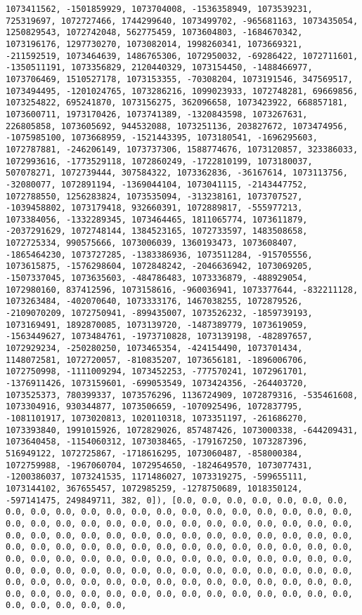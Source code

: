 \documentclass[11pt]{article}
\begin{document}
\begin{verbatim}
1073411562, -1501859929, 1073704008, -1536358949, 1073539231, 725319697, 1072727466, 1744299640, 1073499702, -965681163, 1073435054, 1250829543, 1072742048, 562775459, 1073604803, -1684670342, 1073196176, 1297730270, 1073082014, 1998260341, 1073669321, -211592519, 1073464639, 1486765306, 1072950032, -69286422, 1072711601, -1350511191, 1073356829, 2120440329, 1073154450, -1488466977, 1073706469, 1510527178, 1073153355, -70308204, 1073191546, 347569517, 1073494495, -1201024765, 1073286216, 1099023933, 1072748281, 69669856, 1073254822, 695241870, 1073156275, 362096658, 1073423922, 668857181, 1073600711, 1973170426, 1073741389, -1320843598, 1073267631, 226805858, 1073605692, 944532088, 1073251136, 203827672, 1073474956, -1075985100, 1073668959, -1521443395, 1073180541, -1696295603, 1072787881, -246206149, 1073737306, 1588774676, 1073120857, 323386033, 1072993616, -1773529118, 1072860249, -1722810199, 1073180037, 507078271, 1072739444, 307584322, 1073362836, -36167614, 1073113756, -32080077, 1072891194, -1369044104, 1073041115, -2143447752, 1072788550, 1256283824, 1073535094, -313238161, 1073707527, -1039458802, 1073179418, 932660391, 1072889817, -555977213, 1073384056, -1332289345, 1073464465, 1811065774, 1073611879, -2037291629, 1072748144, 1384523165, 1072733597, 1483508658, 1072725334, 990575666, 1073006039, 1360193473, 1073608407, -1865464230, 1073727285, -1383386936, 1073511284, -915705556, 1073615875, -1576298604, 1072848242, -2046636942, 1073069205, -1507337045, 1073635603, -484786483, 1073336879, -488929054, 1072980160, 837412596, 1073158616, -960036941, 1073377644, -832211128, 1073263484, -402070640, 1073333176, 1467038255, 1072879526, -2109070209, 1072750941, -899435007, 1073526232, -1859739193, 1073169491, 1892870085, 1073139720, -1487389779, 1073619059, -1563449627, 1073484761, -1973710828, 1073139198, -482897657, 1072929234, -250280250, 1073465354, -424154490, 1073701434, 1148072581, 1072720057, -810835207, 1073656181, -1896006706, 1072750998, -1111009294, 1073452253, -777570241, 1072961701, -1376911426, 1073159601, -699053549, 1073424356, -264403720, 1073525373, 780399337, 1073576296, 1136724909, 1072879316, -535461608, 1073304916, 930344877, 1073506659, -1070925496, 1072837795, -1081101917, 1073020813, 1020110318, 1073351197, -261686270, 1073393840, 1991015926, 1072829026, 857487426, 1073000338, -644209431, 1073640458, -1154060312, 1073038465, -179167250, 1073287396, 516949122, 1072725867, -1718616295, 1073060487, -858000384, 1072759988, -1967060704, 1072954650, -1824649570, 1073077431, -1200386037, 1073241535, 1171486027, 1073319275, -599655111, 1073144102, 367655457, 1072985259, -1278750689, 1018350124, -597141475, 249849711, 382, 0]), [0.0, 0.0, 0.0, 0.0, 0.0, 0.0, 0.0, 0.0, 0.0, 0.0, 0.0, 0.0, 0.0, 0.0, 0.0, 0.0, 0.0, 0.0, 0.0, 0.0, 0.0, 0.0, 0.0, 0.0, 0.0, 0.0, 0.0, 0.0, 0.0, 0.0, 0.0, 0.0, 0.0, 0.0, 0.0, 0.0, 0.0, 0.0, 0.0, 0.0, 0.0, 0.0, 0.0, 0.0, 0.0, 0.0, 0.0, 0.0, 0.0, 0.0, 0.0, 0.0, 0.0, 0.0, 0.0, 0.0, 0.0, 0.0, 0.0, 0.0, 0.0, 0.0, 0.0, 0.0, 0.0, 0.0, 0.0, 0.0, 0.0, 0.0, 0.0, 0.0, 0.0, 0.0, 0.0, 0.0, 0.0, 0.0, 0.0, 0.0, 0.0, 0.0, 0.0, 0.0, 0.0, 0.0, 0.0, 0.0, 0.0, 0.0, 0.0, 0.0, 0.0, 0.0, 0.0, 0.0, 0.0, 0.0, 0.0, 0.0, 0.0, 0.0, 0.0, 0.0, 0.0, 0.0, 0.0, 0.0, 0.0, 0.0, 0.0, 0.0, 0.0, 0.0, 0.0, 0.0, 0.0, 0.0, 0.0, 0.0, 0.0, 0.0, 0.0, 0.0, 
\end{verbatim}
\end{document}
